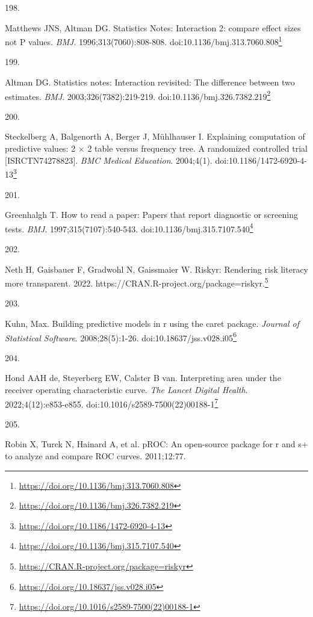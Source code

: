 \documentclass[
  a4paper,
]{book}
\newlength{\cslhangindent}
\newlength{\csllabelwidth}
\newlength{\cslentryspacingunit} %
\newenvironment{CSLReferences}[2] %
 {%
  \setlength{\parindent}{0pt}
  \ifodd #1
  \let\oldpar\par
  \def\par{\hangindent=\cslhangindent\oldpar}
  \fi
  \setlength{\parskip}{#2\cslentryspacingunit}
 }%
 {}
\newcommand{\CSLLeftMargin}[1]{\parbox[t]{\csllabelwidth}{#1}}
\newcommand{\CSLRightInline}[1]{\parbox[t]{\linewidth - \csllabelwidth}{#1}\break}
\renewcommand{\href}[2]{#2\footnote{\url{#1}}}
\begin{document}
\begin{CSLReferences}{0}{0}
\leavevmode{}%
\CSLLeftMargin{198. }%
\CSLRightInline{Matthews JNS, Altman DG. Statistics Notes: Interaction 2: compare effect sizes not P values. \emph{BMJ}. 1996;313(7060):808-808. doi:\href{https://doi.org/10.1136/bmj.313.7060.808}{10.1136/bmj.313.7060.808}}

\leavevmode{}%
\CSLLeftMargin{199. }%
\CSLRightInline{Altman DG. Statistics notes: Interaction revisited: The difference between two estimates. \emph{BMJ}. 2003;326(7382):219-219. doi:\href{https://doi.org/10.1136/bmj.326.7382.219}{10.1136/bmj.326.7382.219}}

\leavevmode{}%
\CSLLeftMargin{200. }%
\CSLRightInline{Steckelberg A, Balgenorth A, Berger J, Mühlhauser I. Explaining computation of predictive values: 2 × 2 table versus frequency tree. A randomized controlled trial {[}ISRCTN74278823{]}. \emph{BMC Medical Education}. 2004;4(1). doi:\href{https://doi.org/10.1186/1472-6920-4-13}{10.1186/1472-6920-4-13}}

\leavevmode{}%
\CSLLeftMargin{201. }%
\CSLRightInline{Greenhalgh T. How to read a paper: Papers that report diagnostic or screening tests. \emph{BMJ}. 1997;315(7107):540-543. doi:\href{https://doi.org/10.1136/bmj.315.7107.540}{10.1136/bmj.315.7107.540}}

\leavevmode{}%
\CSLLeftMargin{202. }%
\CSLRightInline{Neth H, Gaisbauer F, Gradwohl N, Gaissmaier W. Riskyr: Rendering risk literacy more transparent. 2022. \href{https://CRAN.R-project.org/package=riskyr}{https://CRAN.R-project.org/package=riskyr.}}

\leavevmode{}%
\CSLLeftMargin{203. }%
\CSLRightInline{Kuhn, Max. Building predictive models in r using the caret package. \emph{Journal of Statistical Software}. 2008;28(5):1-26. doi:\href{https://doi.org/10.18637/jss.v028.i05}{10.18637/jss.v028.i05}}

\leavevmode{}%
\CSLLeftMargin{204. }%
\CSLRightInline{Hond AAH de, Steyerberg EW, Calster B van. Interpreting area under the receiver operating characteristic curve. \emph{The Lancet Digital Health}. 2022;4(12):e853-e855. doi:\href{https://doi.org/10.1016/s2589-7500(22)00188-1}{10.1016/s2589-7500(22)00188-1}}

\leavevmode{}%
\CSLLeftMargin{205. }%
\CSLRightInline{Robin X, Turck N, Hainard A, et al. pROC: An open-source package for r and s+ to analyze and compare ROC curves. 2011;12:77.}


\end{CSLReferences}
\end{document}
